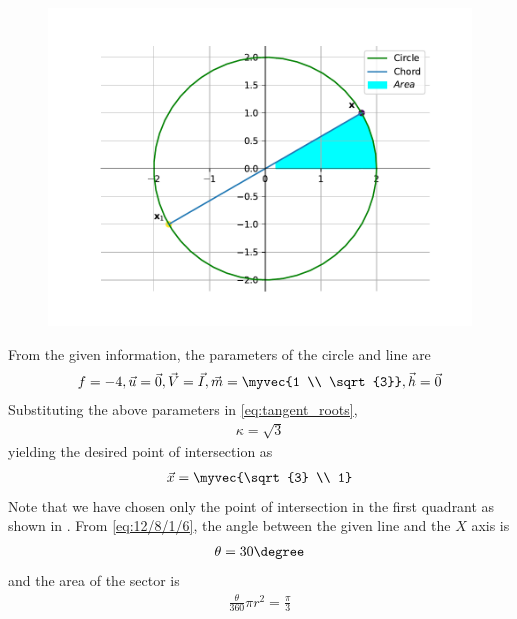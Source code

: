 	\begin{figure}[H]
		\centering
 \includegraphics[width=0.75\columnwidth]{chapters/12/8/1/6/figs/fig.pdf} 
		\caption{}
		\label{fig:12/8/1/6}
  	\end{figure}
  From the given information, the parameters of the  circle and line are
                      \begin{align}
			      f= -4, \vec{u}=\vec{0}, \vec{V}=\vec{I}, \vec{m}=\myvec{1 \\ \sqrt{3}}, \vec{h} = \vec{0}
		\label{eq:12/8/1/6}
                    \end{align}                                                                              
Substituting		    the above parameters in  
\eqref{eq:tangent_roots},
	  \begin{align}                                                                               
		  \kappa= \sqrt{3}
	  \end{align}
	  yielding  
the desired point of intersection as                                               
\begin{align}
	\vec{x} = \myvec{\sqrt{3} \\ 1}                               
\end{align}
Note that we have chosen only the point of intersection in the first quadrant as shown in 
		.
From
		\eqref{eq:12/8/1/6},
		the angle between the given line and the $X$ axis is
\begin{align}
	\theta=30\degree
\end{align} 
and
the area of the sector is 
\begin{align}
	{\frac{\theta}{360}}\pi r^2=
	\frac{\pi}{3}
\end{align}

